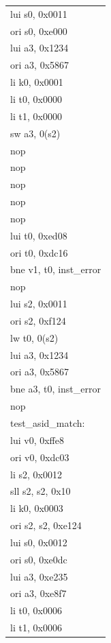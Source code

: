 \documentclass[11pt,utf8]{article}
\begin{document}
{{{\begin{center}
\begin{longtable}{p{15cm}}
{ }{ }{ }{ }lui{ }s0,{ }0x0011\\
{ }{ }{ }{ }ori{ }s0,{ }0xe000\\
{ }{ }{ }{ }lui{ }a3,{ }0x1234\\
{ }{ }{ }{ }ori{ }a3,{ }0x5867\\
{ }{ }{ }{ }li{ }k0,{ }0x0001\\
{ }{ }{ }{ }li{ }t0,{ }0x0000\\
{ }{ }{ }{ }li{ }t1,{ }0x0000\\
{ }{ }{ }{ }sw{ }a3,{ }0(s2)\\
{ }{ }{ }{ }nop\\
{ }{ }{ }{ }nop\\
{ }{ }{ }{ }nop\\
{ }{ }{ }{ }nop\\
{ }{ }{ }{ }nop\\
{ }{ }{ }{ }lui{ }t0,{ }0xed08\\
{ }{ }{ }{ }ori{ }t0,{ }0xdc16\\
{ }{ }{ }{ }bne{ }v1,{ }t0,{ }inst\_error\\
{ }{ }{ }{ }nop\\
{ }{ }{ }{ }lui{ }s2,{ }0x0011\\
{ }{ }{ }{ }ori{ }s2,{ }0xf124\\
{ }{ }{ }{ }lw{ }t0,{ }0(s2)\\
{ }{ }{ }{ }lui{ }a3,{ }0x1234\\
{ }{ }{ }{ }ori{ }a3,{ }0x5867\\
{ }{ }{ }{ }bne{ }a3,{ }t0,{ }inst\_error\\
{ }{ }{ }{ }nop\\
test\_asid\_match:\\
{ }{ }{ }{ }lui{ }v0,{ }0xffe8\\
{ }{ }{ }{ }ori{ }v0,{ }0xdc03\\
{ }{ }{ }{ }li{ }s2,{ }0x0012\\
{ }{ }{ }{ }sll{ }s2,{ }s2,{ }0x10\\
{ }{ }{ }{ }li{ }k0,{ }0x0003\\
{ }{ }{ }{ }ori{ }s2,{ }s2,{ }0xe124\\
{ }{ }{ }{ }lui{ }s0,{ }0x0012\\
{ }{ }{ }{ }ori{ }s0,{ }0xe0dc\\
{ }{ }{ }{ }lui{ }a3,{ }0xe235\\
{ }{ }{ }{ }ori{ }a3,{ }0xe8f7\\
{ }{ }{ }{ }li{ }t0,{ }0x0006\\
{ }{ }{ }{ }li{ }t1,{ }0x0006\\

\end{longtable}
\end{center}}}}
\end{document}
